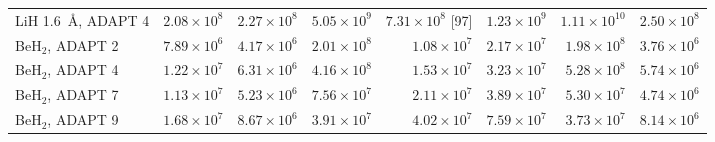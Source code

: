 \begin{tabular}{@{}lrrrrrrr@{}}
LiH 1.6~\AA, ADAPT 4 & $2.08\times10^{8}$ & $2.27\times10^{8}$ & $5.05\times10^{9}$ & $7.31\times10^{8}$ [97] & $1.23\times10^{9}$ & $1.11\times10^{10}$ & $2.50\times10^{8}$ \\
BeH$_2$, ADAPT 2 & $7.89\times10^{6}$ & $4.17\times10^{6}$ & $2.01\times10^{8}$ & $1.08\times10^{7}$ & $2.17\times10^{7}$ & $1.98\times10^{8}$ & $3.76\times10^{6}$ \\
BeH$_2$, ADAPT 4 & $1.22\times10^{7}$ & $6.31\times10^{6}$ & $4.16\times10^{8}$ & $1.53\times10^{7}$ & $3.23\times10^{7}$ & $5.28\times10^{8}$ & $5.74\times10^{6}$ \\
BeH$_2$, ADAPT 7 & $1.13\times10^{7}$ & $5.23\times10^{6}$ & $7.56\times10^{7}$ & $2.11\times10^{7}$ & $3.89\times10^{7}$ & $5.30\times10^{7}$ & $4.74\times10^{6}$ \\
BeH$_2$, ADAPT 9 & $1.68\times10^{7}$ & $8.67\times10^{6}$ & $3.91\times10^{7}$ & $4.02\times10^{7}$ & $7.59\times10^{7}$ & $3.73\times10^{7}$ & $8.14\times10^{6}$ \\
\bottomrule
\end{tabular}
